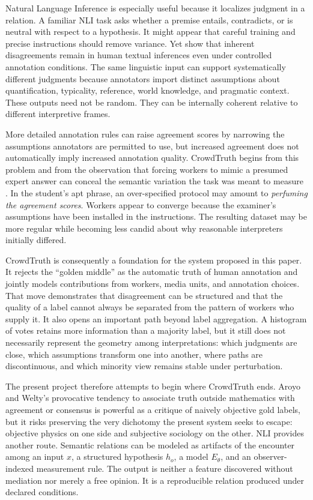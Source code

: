 Natural Language Inference is especially useful because it localizes judgment in a relation. A familiar NLI task asks whether a premise entails, contradicts, or is neutral with respect to a hypothesis. It might appear that careful training and precise instructions should remove variance. Yet \citet{pavlick2019} show that inherent disagreements remain in human textual inferences even under controlled annotation conditions. The same linguistic input can support systematically different judgments because annotators import distinct assumptions about quantification, typicality, reference, world knowledge, and pragmatic context. These outputs need not be random. They can be internally coherent relative to different interpretive frames.

More detailed annotation rules can raise agreement scores by narrowing the assumptions annotators are permitted to use, but increased agreement does not automatically imply increased annotation quality. CrowdTruth begins from this problem and from the observation that forcing workers to mimic a presumed expert answer can conceal the semantic variation the task was meant to measure \citep{aroyo2015}. In the student's apt phrase, an over-specified protocol may amount to \emph{perfuming the agreement scores}. Workers appear to converge because the examiner's assumptions have been installed in the instructions. The resulting dataset may be more regular while becoming less candid about why reasonable interpreters initially differed.

CrowdTruth is consequently a foundation for the system proposed in this paper. It rejects the ``golden middle'' as the automatic truth of human annotation and jointly models contributions from workers, media units, and annotation choices. That move demonstrates that disagreement can be structured and that the quality of a label cannot always be separated from the pattern of workers who supply it. It also opens an important path beyond label aggregation. A histogram of votes retains more information than a majority label, but it still does not necessarily represent the geometry among interpretations: which judgments are close, which assumptions transform one into another, where paths are discontinuous, and which minority view remains stable under perturbation.

The present project therefore attempts to begin where CrowdTruth ends. Aroyo and Welty's provocative tendency to associate truth outside mathematics with agreement or consensus is powerful as a critique of naively objective gold labels, but it risks preserving the very dichotomy the present system seeks to escape: objective physics on one side and subjective sociology on the other. NLI provides another route. Semantic relations can be modeled as artifacts of the encounter among an input \(x\), a structured hypothesis \(h_o\), a model \(E_\theta\), and an observer-indexed measurement rule. The output is neither a feature discovered without mediation nor merely a free opinion. It is a reproducible relation produced under declared conditions.

